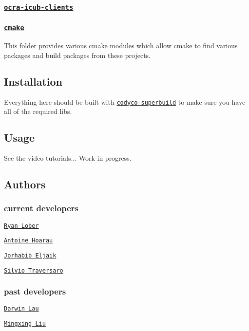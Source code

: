 \subsubsection*{\href{https://github.com/ocra-recipes/ocra-wbi-plugins/tree/master/ocra-icub-clients}{\tt ocra-\/icub-\/clients}}

\subsubsection*{\href{https://github.com/ocra-recipes/ocra-wbi-plugins/tree/master/cmake}{\tt cmake}}

This folder provides various cmake modules which allow cmake to find various packages and build packages from these projects.

\subsection*{Installation}

Everything here should be built with \href{https://github.com/robotology/codyco-superbuild}{\tt {\ttfamily codyco-\/superbuild}} to make sure you have all of the required libs.

\subsection*{Usage}

See the video tutorials... Work in progress.

\subsection*{Authors}

\subsubsection*{current developers}


\begin{DoxyItemize}
\item \href{https://github.com/rlober}{\tt Ryan Lober}
\item \href{https://github.com/ahoarau}{\tt Antoine Hoarau}
\item \href{https://github.com/jeljaik}{\tt Jorhabib Eljaik}
\item \href{https://github.com/traversaro}{\tt Silvio Traversaro}
\end{DoxyItemize}

\subsubsection*{past developers}


\begin{DoxyItemize}
\item \href{https://github.com/darwinlau}{\tt Darwin Lau}
\item \href{https://github.com/mingxing-liu}{\tt Mingxing Liu} 
\end{DoxyItemize}